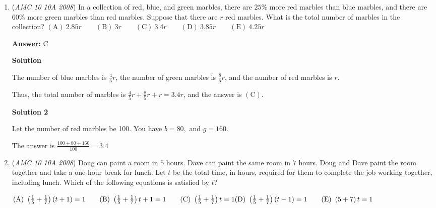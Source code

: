 \begin{enumerate}
\textbf{Solution 3}

Let $r$ be the slowest rate LeRoy can bail out water. It will take them $15$ minutes to get to shore. As stated in solution 1, the number of gallons that enter the boat can be at most $2$ for the boat to stay afloat. Water enters at a rate of $10$ gallons per minute. 

 Therefore:

 $2 \geq 10-r$
$r \geq 8$

 The minimum possible value for $r$ is $8\ \mathrm{(D)}$.

 


	\item (\textit{AMC 10 10A 2008}) In a collection of red, blue, and green marbles, there are $25\%$ more red marbles than blue marbles, and there are $60\%$ more green marbles than red marbles. Suppose that there are $r$ red marbles. What is the total number of marbles in the collection?
$\mathrm{(A)}\ 2.85r\qquad\mathrm{(B)}\ 3r\qquad\mathrm{(C)}\ 3.4r\qquad\mathrm{(D)}\ 3.85r\qquad\mathrm{(E)}\ 4.25r$

 \textbf{Answer: }C



\textbf{Solution}

The number of blue marbles is $\frac{4}{5}r$, the number of green marbles is $\frac{8}{5}r$, and the number of red marbles is $r$.

 Thus, the total number of marbles is $\frac{4}{5}r+\frac{8}{5}r+r=3.4r$, and the answer is $\mathrm{(C)}$.

 



\textbf{Solution 2}

Let the number of red marbles be 100. You have $b = 80,$ and $g = 160.$ 

 The answer is $\frac{100+80+160}{100} = \boxed{3.4}$



	\item (\textit{AMC 10 10A 2008}) Doug can paint a room in $5$ hours. Dave can paint the same room in $7$ hours. Doug and Dave paint the room together and take a one-hour break for lunch. Let $t$ be the total time, in hours, required for them to complete the job working together, including lunch. Which of the following equations is satisfied by $t$?


 $\mathrm{(A)}\ \left(\frac{1}{5}+\frac{1}{7}\right)\left(t+1\right)=1\qquad\mathrm{(B)}\ \left(\frac{1}{5}+\frac{1}{7}\right)t+1=1\qquad\mathrm{(C)}\ \left(\frac{1}{5}+\frac{1}{7}\right)t=1\\\mathrm{(D)}\ \left(\frac{1}{5}+\frac{1}{7}\right)\left(t-1\right)=1\qquad\mathrm{(E)}\ \left(5+7\right)t=1$


\end{enumerate}
